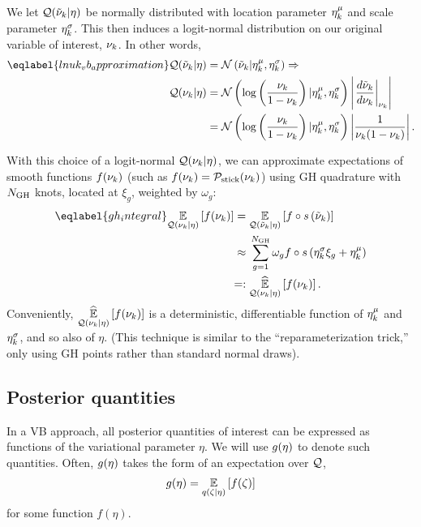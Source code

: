 We let $\mathcal{Q}(\tilde{\nu}_k \vert \eta)$ be normally distributed with
location parameter $\eta^{\mu}_k$ and scale parameter $\eta^{\sigma}_k$.
This then induces a logit-normal
distribution on our original variable of interest, $\nu_{k}$.
In other words,
\begin{align}\eqlabel{lnuk_vb_approximation}
%
\q(\lnu_\k \vert \eta) ={}& \normdist{\lnu_\k \vert \lnumean_\k, \lnusd_\k}
\Rightarrow \\
\q(\nuk \vert \eta) ={}&
    \normdist{\log \left( \frac{\nuk}{1 - \nuk} \right)
        \vert \lnumean_\k, \lnusd_\k}
    \left|\fracat{d \lnu_\k}{ d\nuk}{\nuk}\right|
\nonumber\\={}&
\normdist{\log \left( \frac{\nuk}{1 - \nuk} \right)
        \vert \lnumean_\k, \lnusd_\k}
    \left|\frac{1}{\nuk (1 - \nuk)}\right|.
\nonumber
%
\end{align}


With this choice of a logit-normal $\mathcal{Q}(\nu_{k} \vert \eta)$,
we can approximate expectations of smooth functions
$f(\nu_{k})$ (such as $f(\nu_{k}) = \mathcal{P}_{\mathrm{stick}}(\nu_{k})$) using GH quadrature with $N_{\mathrm{GH}}$ knots,
located at $\xi_g$, weighted by $\omega_g$:
%
\begin{align}\eqlabel{gh_integral}
%
\expect{\q(\nuk \vert \eta)}{f(\nuk)} ={}&
\expect{\q(\lnu_\k \vert \eta)}
       {f\circ \s\left(\lnu_\k\right)}
\nonumber\\\approx{}&
    \sum_{g=1}^{\ngh} \omega_g f\circ \s \left(\lnusd_\k \xi_{g} + \lnumean_\k\right)
 \nonumber\\=:{}&
\expecthat{\q(\nuk \vert \eta)}{f(\nuk)}.
%
\end{align}
%
Conveniently, $\underset{\mathcal{Q}(\nu_{k} \vert \eta)}{\widehat{\mathbb{E}}}\left[f(\nu_{k})\right]$ is a deterministic, differentiable
function of $\eta^{\mu}_k$ and $\eta^{\sigma}_k$, and so also of $\eta$.  (This
technique is similar to the ``reparameterization trick,'' only using
GH points rather than standard normal draws).


\subsection{Posterior quantities}

In a VB approach, all posterior quantities of interest can be expressed as
functions of the variational parameter $\eta$. We will use $g(\eta)$ to denote
such quantities. Often, $g(\eta)$ takes the form of an expectation over $\mathcal{Q}$,
\begin{align*}
  g(\eta) = \underset{q(\zeta\vert\eta)}{\mathbb{E}}\left[f(\zeta)\right]
\end{align*}
for some function $f(\eta)$.

